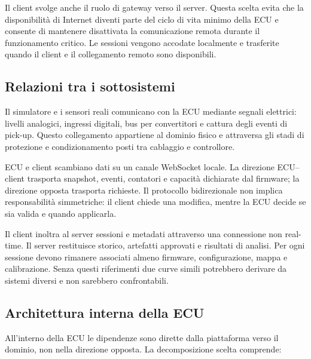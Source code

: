 \documentclass{article}
\begin{document}
Il client svolge anche il ruolo di gateway verso il server. Questa scelta evita
che la disponibilità di Internet diventi parte del ciclo di vita minimo della
ECU e consente di mantenere disattivata la comunicazione remota durante il
funzionamento critico. Le sessioni vengono accodate localmente e trasferite
quando il client e il collegamento remoto sono disponibili.

\subsection{Relazioni tra i sottosistemi}

Il simulatore e i sensori reali comunicano con la ECU mediante segnali elettrici:
livelli analogici, ingressi digitali, bus per convertitori e cattura degli eventi
di pick-up. Questo collegamento appartiene al dominio fisico e attraversa gli
stadi di protezione e condizionamento posti tra cablaggio e controllore.

ECU e client scambiano dati su un canale WebSocket locale. La direzione ECU--client
trasporta snapshot, eventi, contatori e capacità dichiarate dal firmware; la
direzione opposta trasporta richieste. Il protocollo bidirezionale non implica
responsabilità simmetriche: il client chiede una modifica, mentre la ECU decide
se sia valida e quando applicarla.

Il client inoltra al server sessioni e metadati attraverso una connessione non
real-time. Il server restituisce storico, artefatti approvati e risultati di
analisi. Per ogni sessione devono rimanere associati almeno firmware,
configurazione, mappa e calibrazione. Senza questi riferimenti due curve simili
potrebbero derivare da sistemi diversi e non sarebbero confrontabili.

\subsection{Architettura interna della ECU}

All'interno della ECU le dipendenze sono dirette dalla piattaforma verso il
dominio, non nella direzione opposta. La decomposizione scelta comprende:
\end{document}
